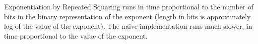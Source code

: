 Exponentiation by Repeated Squaring runs in time proportional to the number of
bits in the binary representation of the exponent (length in bits is
approximately log of the value of the exponent). The naive implementation runs
much slower, in time proportional to the value of the exponent.
